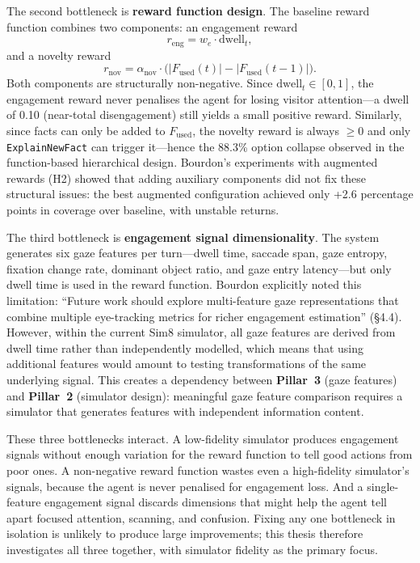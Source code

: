 \documentclass[a4paper, 11pt]{article}
\newcommand{\reng}{r_{\mathrm{eng}}}
\newcommand{\rnov}{r_{\mathrm{nov}}}
\newcommand{\dwell}{\mathrm{dwell}_t}
\newcommand{\Fused}{F_{\mathrm{used}}}
\newcommand{\pillar}[1]{\textbf{Pillar~#1}}
\begin{document}
The second bottleneck is \textbf{reward function design}. The baseline reward function combines two components: an engagement reward
\begin{equation}
  \reng = w_e \cdot \dwell,
\end{equation}
and a novelty reward
\begin{equation}
  \rnov = \alpha_{\mathrm{nov}} \cdot \bigl(|\Fused(t)| - |\Fused(t-1)|\bigr).
\end{equation}
Both components are structurally non-negative. Since $\dwell \in [0,1]$, the engagement reward never penalises the agent for losing visitor attention---a dwell of 0.10 (near-total disengagement) still yields a small positive reward. Similarly, since facts can only be added to $\Fused$, the novelty reward is always $\geq 0$ and only \texttt{ExplainNewFact} can trigger it---hence the 88.3\% option collapse observed in the function-based hierarchical design. Bourdon's experiments with augmented rewards (H2) showed that adding auxiliary components did not fix these structural issues: the best augmented configuration achieved only +2.6 percentage points in coverage over baseline, with unstable returns.

The third bottleneck is \textbf{engagement signal dimensionality}. The system generates six gaze features per turn---dwell time, saccade span, gaze entropy, fixation change rate, dominant object ratio, and gaze entry latency---but only dwell time is used in the reward function. Bourdon explicitly noted this limitation: ``Future work should explore multi-feature gaze representations that combine multiple eye-tracking metrics for richer engagement estimation'' (\S4.4). However, within the current Sim8 simulator, all gaze features are derived from dwell time rather than independently modelled, which means that using additional features would amount to testing transformations of the same underlying signal. This creates a dependency between \pillar{3} (gaze features) and \pillar{2} (simulator design): meaningful gaze feature comparison requires a simulator that generates features with independent information content.

These three bottlenecks interact. A low-fidelity simulator produces engagement signals without enough variation for the reward function to tell good actions from poor ones. A non-negative reward function wastes even a high-fidelity simulator's signals, because the agent is never penalised for engagement loss. And a single-feature engagement signal discards dimensions that might help the agent tell apart focused attention, scanning, and confusion. Fixing any one bottleneck in isolation is unlikely to produce large improvements; this thesis therefore investigates all three together, with simulator fidelity as the primary focus.
\end{document}
